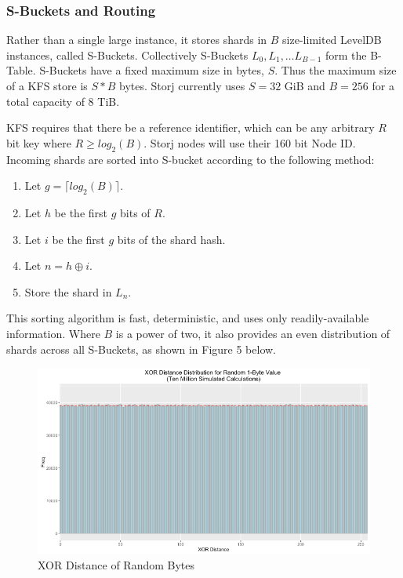 \documentclass[a4paper,10pt]{article}
\begin{document}
\subsubsection{S-Buckets and Routing}
Rather than a single large instance, it stores shards in $ B $ size-limited LevelDB instances, called S-Buckets. Collectively S-Buckets $ L_{0} , L_{1} , … L_{B-1} $ form the B-Table. S-Buckets have a fixed maximum size in bytes, $ S $. Thus the maximum size of a KFS store is $ S * B $ bytes. Storj currently uses $ S = 32 $ GiB and $ B = 256 $ for a total capacity of 8 TiB.

KFS requires that there be a reference identifier, which can be any arbitrary $ R $ bit key where $ R \geq log_{2}(B) $. Storj nodes will use their 160 bit Node ID. Incoming shards are sorted into S-bucket according to the following method:

\begin{enumerate}
\item Let $ g = \lceil log_{2}(B) \rceil $.
\item Let $ h $ be the first $ g $ bits of $ R $.
\item Let $ i $ be the first $ g $ bits of the shard hash.
\item Let $ n = h \oplus i $.
\item Store the shard in $ L_{n} $.
\end{enumerate}

This sorting algorithm is fast, deterministic, and uses only readily-available information. Where $ B $ is a power of two, it also provides an even distribution of shards across all S-Buckets, as shown in Figure 5 below.


\begin{figure}[hbt]
\centering
\includegraphics[width=\linewidth]{5}
\caption{XOR Distance of Random Bytes}
\end{figure}
\end{document}
